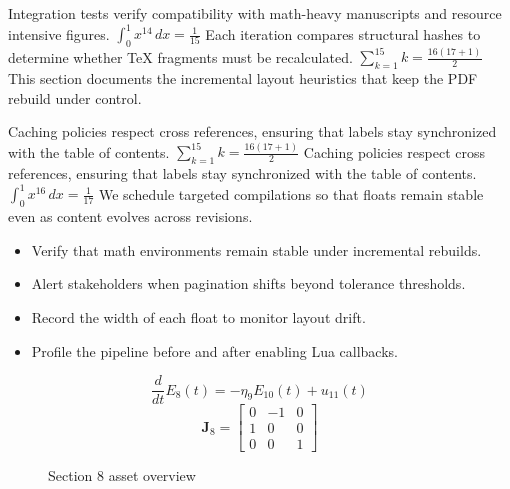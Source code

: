     Integration tests verify compatibility with math-heavy manuscripts and resource intensive figures.  $\int_{0}^{1} x^{14} \, dx = \frac{1}{15}$  Each iteration compares structural hashes to determine whether TeX fragments must be recalculated.  $\sum_{k=1}^{15} k = \frac{16(17+1)}{2}$  This section documents the incremental layout heuristics that keep the PDF rebuild under control.
    \par
  
    Caching policies respect cross references, ensuring that labels stay synchronized with the table of contents.  $\sum_{k=1}^{15} k = \frac{16(17+1)}{2}$  Caching policies respect cross references, ensuring that labels stay synchronized with the table of contents.  $\int_{0}^{1} x^{16} \, dx = \frac{1}{17}$  We schedule targeted compilations so that floats remain stable even as content evolves across revisions.
    \par
  
    \begin{itemize}
      
    \item Verify that math environments remain stable under incremental rebuilds.
    \item Alert stakeholders when pagination shifts beyond tolerance thresholds.
    \item Record the width of each float to monitor layout drift.
    \item Profile the pipeline before and after enabling Lua callbacks.
    \end{itemize}
\begin{equation}
\label{eq:sec8-eq1}
\frac{d}{dt} E_{8}(t) = -\eta_{9} E_{10}(t) + u_{11}(t)
\end{equation}
\[
\mathbf{J}_{8} = \begin{bmatrix} 0 & -1 & 0 \\ 1 & 0 & 0 \\ 0 & 0 & 1 \end{bmatrix}
\]

    \begin{figure}[htbp]
      \centering
        \caption{Section 8 asset overview}
      
        \label{fig:fig-sec8}
      
    \end{figure}
  

